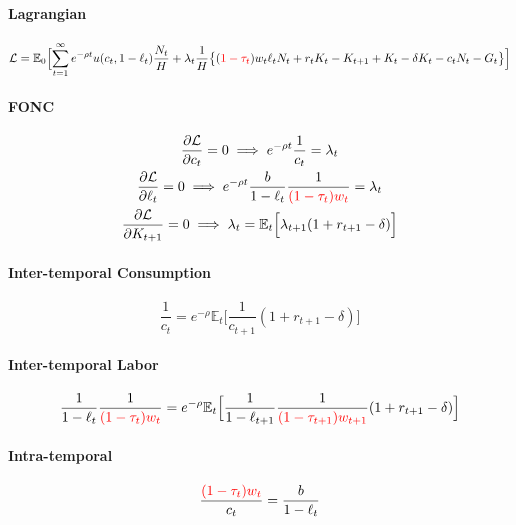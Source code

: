 \documentclass[11pt]{article}
\newcommand{\expat}[2]{\mathbb{E}_{#1}\Big[{#2}\Big]}
\begin{document}
			\paragraph{Lagrangian}
				\begin{equation}
					\mc{L} = \expat{0}{ \sum_{t=1}^\infty e^{-\rho t} u(c_t, 1 - \ell_t) \frac{N_t}{H} + \lambda_t \frac{1}{H} 
						\big \{ (\textcolor{red}{1-\tau_t}) w_t \ell_t N_t + r_t K_t - K_{t+1} + K_t - \delta K_t - c_t N_t - G_t \big \} }
				\end{equation}
			\paragraph{FONC}
				\begin{gather}
					\pd{\mc{L}}{c_t} = 0
					\implies e^{-\rho t} \frac{1}{c_t} = \lambda_t \\
					\pd{\mc{L}}{\ell_t} = 0
					\implies e^{-\rho t} \frac{b}{1 - \ell_t} \frac{1}{\textcolor{red}{(1 - \tau_t)w_t}} = \lambda_t \\
					\pd{\mc{L}}{K_{t+1}} = 0 \implies \lambda_t = \expat{t}{\lambda_{t+1} (1 + r_{t+1} - \delta)}
				\end{gather}
			\paragraph{Inter-temporal Consumption}
				\begin{equation}
					\frac{1}{c_t} = e^{-\rho} \expat{t}{
						\frac{1}{c_{t+1}} (1 + r_{t+1} - \delta)
					}
				\end{equation}
				
			\paragraph{Inter-temporal Labor}
				\begin{equation}
					\frac{1}{1 - \ell_t} \frac{1}{\textcolor{red}{(1 - \tau_t)w_t}} = e^{-\rho} \expat{t}{
							\frac{1}{1 - \ell_{t+1}}\frac{1}{\textcolor{red}{(1 - \tau_{t+1}) w_{t+1}}} (1 + r_{t+1} - \delta)
							}
				\end{equation}
				
			\paragraph{Intra-temporal}
				\begin{equation}
					\frac{\textcolor{red}{(1-\tau_t)w_t}}{c_t} = \frac{b}{1-\ell_t}
				\end{equation}
		
\end{document}
